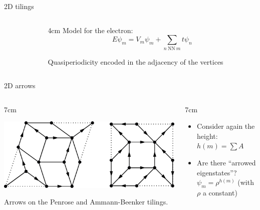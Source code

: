 \documentclass[xcolor=x11names,compress,professionalfonts, aspectratio=169]{beamer}
\renewcommand{\(}{\begin{columns}}
\renewcommand{\)}{\end{columns}}
\newcommand{\<}[1]{\begin{column}{#1}}
\renewcommand{\>}{\end{column}}
\begin{document}
\begin{frame}{2D tilings}
\begin{columns}
\begin{column}{5cm}
{}
\end{column}
\<{4cm}
Model for the electron:
\[
	E \psi_m = V_m \psi_m + \sum_{n ~\text{NN}~m} t \psi_n
\]

Quasiperiodicity encoded in the adjacency of the vertices
\>
\end{columns}

\end{frame}

%
%
%

\begin{frame}{2D arrows}

%
%

\begin{columns}
\<{7cm}
{\centering
\includegraphics[scale=.35]{img/arrows_2D.pdf}

Arrows on the Penrose and Ammann-Beenker tilings.
}
\>
\<{7cm}
\begin{itemize}
	\item Consider again the height: $h(m) = \sum A$
	\item Are there ``arrowed eigenstates''? $\psi_m = \rho^{h(m)}$ (with $\rho$ a constant)
\end{itemize}
\>
\end{columns}

\end{frame}
\end{document}
